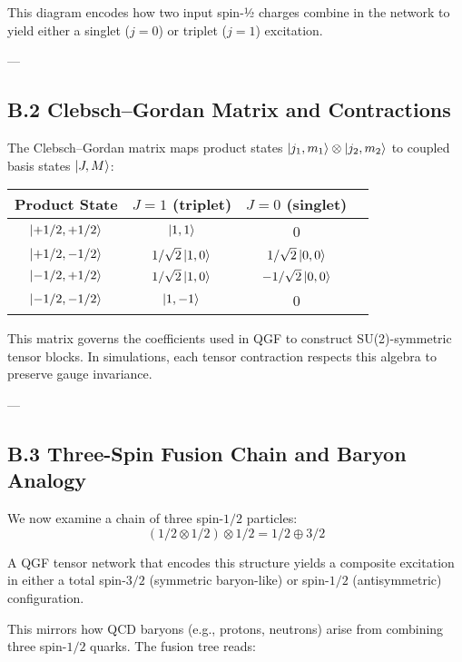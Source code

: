 \documentclass[11pt]{article}
\def\frac#1#2{#1/#2}
\def\left{}
\def\right{}
\begin{document}
This diagram encodes how two input spin-½ charges combine in the network to yield either a singlet ($j = 0$) or triplet ($j = 1$) excitation.

---

\subsection*{B.2 Clebsch--Gordan Matrix and Contractions}

The Clebsch--Gordan matrix maps product states $\ket{j_1, m_1} \otimes \ket{j_2, m_2}$ to coupled basis states $\ket{J, M}$:

\begin{center}
\begin{tabular}{c|ccc}
Product State & $J=1$ (triplet) & $J=0$ (singlet) \\
\hline
$\ket{+\frac{1}{2}, +\frac{1}{2}}$ & $\ket{1,1}$ & 0 \\
$\ket{+\frac{1}{2}, -\frac{1}{2}}$ & $\frac{1}{\sqrt{2}} \ket{1,0}$ & $\frac{1}{\sqrt{2}} \ket{0,0}$ \\
$\ket{-\frac{1}{2}, +\frac{1}{2}}$ & $\frac{1}{\sqrt{2}} \ket{1,0}$ & $- \frac{1}{\sqrt{2}} \ket{0,0}$ \\
$\ket{-\frac{1}{2}, -\frac{1}{2}}$ & $\ket{1,-1}$ & 0 \\
\end{tabular}
\end{center}

This matrix governs the coefficients used in QGF to construct SU(2)-symmetric tensor blocks. In simulations, each tensor contraction respects this algebra to preserve gauge invariance.

---

\subsection*{B.3 Three-Spin Fusion Chain and Baryon Analogy}

We now examine a chain of three spin-$\frac{1}{2}$ particles:
\[
\left( \frac{1}{2} \otimes \frac{1}{2} \right) \otimes \frac{1}{2} = \frac{1}{2} \oplus \frac{3}{2}
\]

A QGF tensor network that encodes this structure yields a composite excitation in either a total spin-$\frac{3}{2}$ (symmetric baryon-like) or spin-$\frac{1}{2}$ (antisymmetric) configuration.

This mirrors how QCD baryons (e.g., protons, neutrons) arise from combining three spin-$\frac{1}{2}$ quarks. The fusion tree reads:
\end{document}
